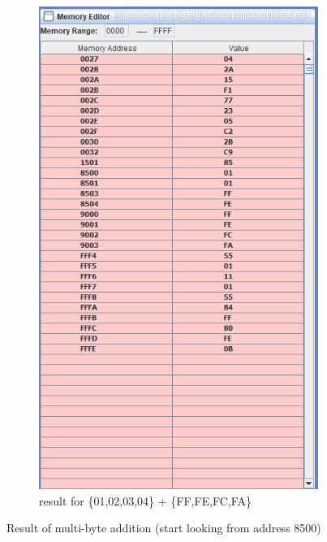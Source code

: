 \documentclass[a4paper]{article} %
\begin{document}
\begin{figure}[h!]
\begin{subfigure}[b]{0.49\linewidth}
                \label{fg5a}
            \end{subfigure}
            \begin{subfigure}[b]{0.49\linewidth}
                \centering
                \includegraphics[width=\linewidth]{Assignment 2/3_multibyte_add/01020304_FFFEFCFA.png}
                \caption{result for \{01,02,03,04\} + \{FF,FE,FC,FA\}}
                \label{fg5b}
            \end{subfigure}
            \caption{Result of multi-byte addition (start looking from address 8500)}
            \label{fg5}
        \end{figure}
\end{document}
